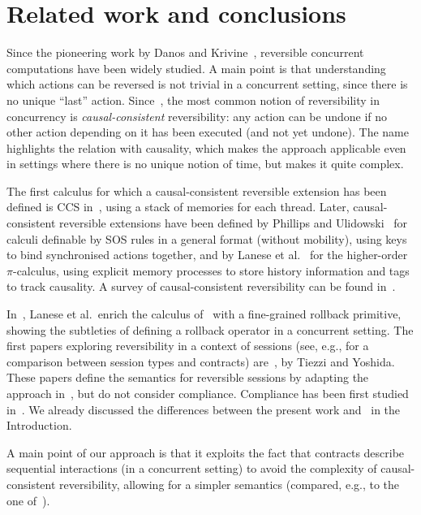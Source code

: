 \documentclass[UKenglish]{eptcs}
\begin{document}
\section{Related work and conclusions}



Since the pioneering work by Danos and Krivine~\cite{DK04}, reversible
concurrent computations have been widely studied. A main point is that
understanding which actions can be reversed is not trivial in a
concurrent setting, since there is no unique ``last''
action. Since~\cite{DK04}, the most common notion of reversibility in
concurrency is \emph{causal-consistent} reversibility: any action can
be undone if no other action depending on it has been executed (and
not yet undone). The name highlights the 
relation with causality, which 
makes the approach applicable even in settings where there is no
unique notion of time, but makes it quite complex.

The first calculus for which a causal-consistent reversible extension has been defined is CCS in~\cite{DK04}, using a stack of
memories for each thread. Later, causal-consistent reversible extensions have been defined by Phillips and
Ulidowski~\cite{PU07} for calculi definable by SOS rules in a general
format (without mobility), using keys to bind synchronised actions
together, and by Lanese et al.~\cite{LMS10} for the higher-order
$\pi$-calculus, using explicit memory processes to store history
information and tags to track causality. A survey of causal-consistent
reversibility can be found in~\cite{LMT14}.

In~\cite{LMSS11}, Lanese et al.\ enrich the calculus of~\cite{LMS10}
with a fine-grained rollback primitive, showing the subtleties of
defining a rollback operator in a concurrent setting.  The first papers
exploring reversibility in a context of sessions (see, e.g., \cite{LaneveP08} for a comparison between
session types and contracts) are~\cite{TY14,TY15}, by
Tiezzi and Yoshida. These papers define the semantics for reversible
sessions by adapting the approach in~\cite{LMS10}, but do not
consider compliance. Compliance has been first studied
in~\cite{BarbaneraDdL14}. We already discussed the differences between
the present work and~\cite{BarbaneraDdL14} in the Introduction.


A main point of our approach is that it exploits the fact that
contracts describe sequential interactions (in a concurrent setting)
to avoid the complexity of causal-consistent reversibility, allowing
for a simpler semantics (compared, e.g., to the one of~\cite{LMSS11}).
\end{document}
